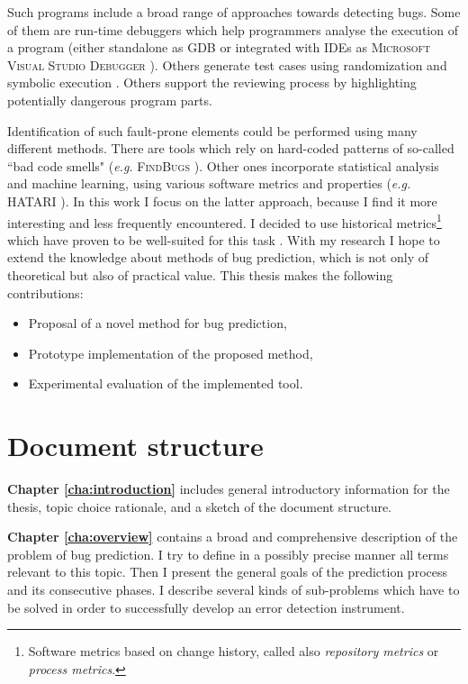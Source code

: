\documentclass{pracamgr}
\begin{document}
Such programs include a broad range of approaches towards detecting bugs. Some of them are run-time debuggers which help programmers analyse the execution of a program (either standalone as GDB \cite{gdb} or integrated with IDEs as \textsc{Microsoft Visual Studio Debugger} \cite{vs_debugger}). Others generate test cases using randomization and symbolic execution \cite{symbolic, puzzle}. Others support the reviewing process by highlighting potentially dangerous program parts.

Identification of such fault-prone elements could be performed using many different methods. There are tools which rely on hard-coded patterns of so-called ``bad code smells" (\textit{e.g.} \textsc{FindBugs} \cite{findbugs}). Other ones incorporate statistical analysis and machine learning, using various software metrics and properties (\textit{e.g.} HATARI \cite{hatari}). In this work I focus on the latter approach, because I find it more interesting and less frequently encountered. I decided to use historical metrics\footnote{Software metrics based on change history, called also \emph{repository metrics} or \emph{process metrics}.} which have proven to be well-suited for this task \cite{merits, comparative, how_and_why}. With my research I hope to extend the knowledge about methods of bug prediction, which is not only of theoretical but also of practical value. This thesis makes the following contributions:
\begin{itemize}
	\item Proposal of a novel method for bug prediction,
	\item Prototype implementation of the proposed method,
	\item Experimental evaluation of the implemented tool.
\end{itemize}

\section{Document structure}
\label{sec:structure}

\textbf{Chapter \ref{cha:introduction}} includes general introductory information for the thesis, topic choice rationale, and a sketch of the document structure. 

\medskip \noindent
\textbf{Chapter \ref{cha:overview}} contains a broad and comprehensive description of the problem of bug prediction. I try to define in a possibly precise manner all terms relevant to this topic. Then I present the general goals of the prediction process and its consecutive phases. I describe several kinds of sub-problems which have to be solved in order to successfully develop an error detection instrument.
\end{document}
